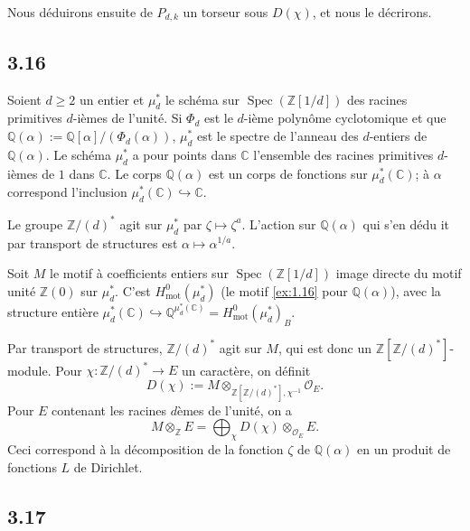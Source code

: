 \documentclass[12pt,a4paper]{article}
\theoremstyle{plain}
\theoremstyle{definition}
\theoremstyle{remark}
\DeclareMathOperator{\Spec}{Spec}
\newcommand{\mot}{\mathrm{mot}}
\providecommand{\Spec}{\operatorname{Spec}}
\providecommand{\mot}{\mathrm{mot}}
\begin{document}
Nous d\'eduirons ensuite de $P_{d,k}$ un torseur sous $D(\chi)$, et nous le d\'ecrirons.

\subsection*{3.16}

Soient \(d \geq 2\) un entier et \(\mu_d^*\) le schéma sur
\(\Spec(\mathbb{Z}[1/d])\) des racines primitives \(d\)-ièmes de l'unité. Si
\(\Phi_d\) est le \(d\)-ième polynôme cyclotomique et que
\(\mathbb{Q}(\alpha):=\mathbb{Q}[\alpha]/(\Phi_d(\alpha))\), \(\mu_d^*\) est le spectre de l'anneau des
\(d\)-entiers de \(\mathbb{Q}(\alpha)\). Le schéma \(\mu_d^*\) a pour points dans
\(\mathbb{C}\) l'ensemble des racines primitives \(d\)-ièmes de \(1\) dans \(\mathbb{C}\). Le
corps \(\mathbb{Q}(\alpha)\) est un corps de fonctions sur \(\mu_d^*(\mathbb{C})\); à
\(\alpha\) correspond l'inclusion \(\mu_d^*(\mathbb{C}) \hookrightarrow \mathbb{C}\).

Le groupe $\mathbb{Z}/(d)^*$ agit sur $\mu_d^*$ par $\zeta \mapsto \zeta^a$. L'action sur
$\mathbb{Q}(\alpha)$ qui s'en d\'edu it par transport de structures est
$\alpha \mapsto \alpha^{1/a}$.

Soit $M$ le motif \`a coefficients entiers sur $\Spec(\mathbb{Z}[1/d])$ image directe du
motif unit\'e $\mathbb{Z}(0)$ sur $\mu_d^*$. C'est $H^0_\mot(\mu_d^*)$ (le motif
\ref{ex:1.16} pour $\mathbb{Q}(\alpha)$), avec la structure enti\`ere
$\mu_d^*(\mathbb{C}) \hookrightarrow \mathbb{Q}^{\mu_d^*(\mathbb{C})} =
H^0_\mot(\mu_d^*)_B$.

Par transport de structures, $\mathbb{Z}/(d)^*$ agit sur $M$, qui est donc un
$\mathbb{Z}[\mathbb{Z}/(d)^*]$-module. Pour $\chi: \mathbb{Z}/(d)^* \to E$ un
caract\`ere, on d\'efinit
\[
D(\chi) := M \otimes_{\mathbb{Z}[\mathbb{Z}/(d)^*], \chi^{-1}} \mathcal{O}_E.
\]
Pour $E$ contenant les racines $d$\`emes de l'unit\'e, on a
\[
M \otimes_{\mathbb{Z}} E = \bigoplus_\chi D(\chi) \otimes_{\mathcal{O}_E} E.
\]
Ceci correspond \`a la d\'ecomposition de la fonction $\zeta$ de $\mathbb{Q}(\alpha)$ en un
produit de fonctions $L$ de Dirichlet.

\subsection*{3.17}
\end{document}

